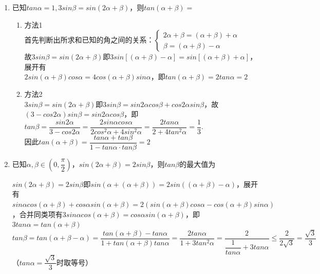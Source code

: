 \begin{enumerate}
\begin{enumerate}
\begin{jieda}
        \end{jieda}
        \item 已知$tan\alpha = 1, 3sin\beta = sin(2\alpha + \beta)$，则$tan(\alpha + \beta) = $
        \begin{jieda}
            \begin{enumerate}
                \item 方法1 \\
                首先判断出所求和已知的角之间的关系：$\left \{ \begin{array}{l}
                 2\alpha + \beta = (\alpha + \beta) + \alpha  \\
                 \beta = (\alpha + \beta) - \alpha
                \end{array} \right.$ \\
                故$3sin\beta = sin(2\alpha + \beta)$即$3sin[(\alpha+\beta) - \alpha] = sin[(\alpha+\beta) + \alpha]$，展开有\\
                $2sin(\alpha+\beta)cos\alpha = 4cos(\alpha+\beta)sin\alpha$，即$tan(\alpha+\beta) = 2tan\alpha = 2$
                \item 方法2 \\
                $3sin\beta = sin(2\alpha + \beta)$即$3sin\beta = sin2\alpha cos\beta + cos2\alpha sin\beta$，故$(3-cos2\alpha)sin\beta = sin2\alpha cos\beta$，即$tan\beta = \dfrac{sin2\alpha}{3 - cos2\alpha} = \dfrac{2sin\alpha cos\alpha}{2cos^2\alpha+4sin^2\alpha} = \dfrac{2tan\alpha}{2+4tan^2\alpha} = \dfrac{1}{3}$. \\
                因此$tan(\alpha+\beta) = \dfrac{tan\alpha+tan\beta}{1-tan\alpha \cdot tan\beta} = 2$
            \end{enumerate}
        \end{jieda}
        \item 已知$\alpha,\beta \in (0, \dfrac{\pi}{2})$，$sin(2\alpha+\beta) = 2sin\beta$，则$tan\beta$的最大值为
        \begin{jieda}
            $sin(2\alpha+\beta) = 2sin\beta$即$sin(\alpha+(\alpha+\beta)) = 2sin((\alpha+\beta)-\alpha)$，展开有$sin\alpha cos(\alpha+\beta) + cos\alpha sin(\alpha+\beta) = 2(sin(\alpha+\beta)cos\alpha - cos(\alpha+\beta)sin\alpha)$，合并同类项有$3sin\alpha cos(\alpha+\beta) = cos\alpha sin(\alpha+\beta)$，即$3tan\alpha = tan(\alpha+\beta)$ \\
            $tan\beta = tan(\alpha+\beta - \alpha) = \dfrac{tan(\alpha+\beta) - tan\alpha}{1 + tan(\alpha+\beta)tan\alpha} = \dfrac{2tan\alpha}{1+3tan^2\alpha} = \dfrac{2}{\dfrac{1}{tan\alpha}+3tan\alpha} \leq \dfrac{2}{2\sqrt{3}} = \dfrac{\sqrt{3}}{3}$（$tan\alpha = \dfrac{\sqrt{3}}{3}$时取等号）

\end{jieda}
\end{enumerate}
\end{enumerate}
